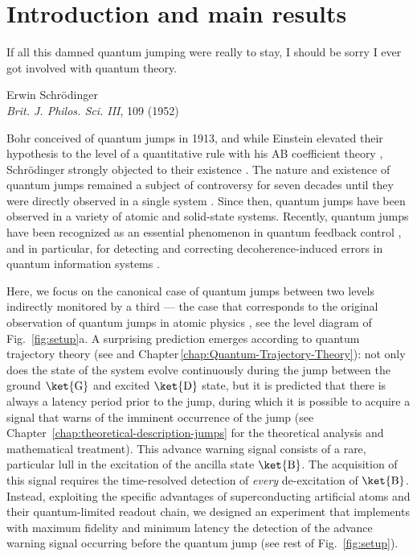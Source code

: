 
\chapter{Introduction and main results\label{chap:Introduction-and-overview}}


\singlespacing 
\epigraph{
If all this damned quantum jumping were really to stay,  I should be sorry I ever got involved with quantum theory.}
{Erwin Schr\"odinger\\ \textit{Brit. J. Philos. Sci. III}, 109 (1952)} 
\doublespacing  \noindent Bohr conceived of quantum jumps \citet{Bohr1913} in 1913, and while
Einstein elevated their hypothesis to the level of a quantitative
rule with his AB coefficient theory \citep{Einstein1916,Einstein1917},
Schrödinger strongly objected to their existence \citep{Schrodinger1952}.
The nature and existence of quantum jumps remained a subject of controversy
for seven decades until they were directly observed in a single system
\citep{Nagourney1986,Sauter1986,Bergquist1986}. Since then, quantum
jumps have been observed in a variety of atomic \citep{Basche1995,Peil1999,Gleyzes2007,Guerlin2007}
and solid-state \citep{Jelezko2002,Neumann2010,Robledo2011,Vijay2011,Hatridge2013}
systems. Recently, quantum jumps have been recognized as an essential
phenomenon in quantum feedback control \citep{Deleglise2008,Sayrin2001},
and in particular, for detecting and correcting decoherence-induced
errors in quantum information systems \citep{Sun2013,Ofek2016}.

Here, we focus on the canonical case of quantum jumps between two
levels indirectly monitored by a third --- the case that corresponds
to the original observation of quantum jumps in atomic physics \citep{Nagourney1986,Sauter1986,Bergquist1986},
see the level diagram of Fig.~\ref{fig:setup}a. A surprising prediction
emerges according to quantum trajectory theory (see \citet{Carmichael1993,Porrati1987,Ruskov2007}
and Chapter\,\ref{chap:Quantum-Trajectory-Theory}): not only does
the state of the system evolve continuously during the jump between
the ground $\ket{\mathrm{G}}$ and excited $\ket{\mathrm{D}}$ state,
but it is predicted that there is always a latency period prior to
the jump, during which it is possible to acquire a signal that warns
of the imminent occurrence of the jump (see Chapter~\ref{chap:theoretical-description-jumps}
for the theoretical analysis and mathematical treatment). This advance
warning signal consists of a rare, particular lull in the excitation
of the ancilla state $\ket{\mathrm{B}}$. The acquisition of this
signal requires the time-resolved detection of\textit{ every} de-excitation
of $\ket{\mathrm{B}}$. Instead, exploiting the specific advantages
of superconducting artificial atoms and their quantum-limited readout
chain, we designed an experiment that implements with maximum fidelity
and minimum latency the detection of the advance warning signal occurring
before the quantum jump (see rest of Fig.~\ref{fig:setup}).

